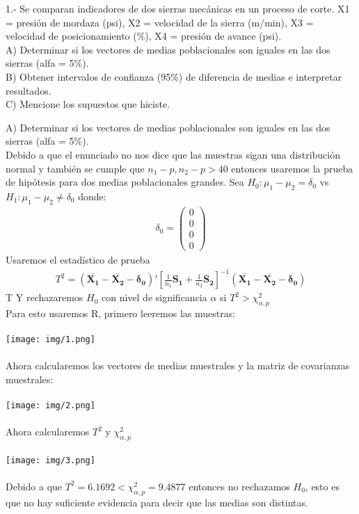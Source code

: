 \begin{problem}{1}
 1.- Se comparan indicadores de dos sierras mecánicas en un proceso de corte. 
X1 = presión de mordaza (psi), X2 = velocidad de la sierra (m/min), 
X3 = velocidad de posicionamiento (\%), X4 = presión de avance (psi).\\
A) Determinar si los vectores de medias poblacionales son iguales en las dos sierras (alfa = 5\%). \\
B) Obtener intervalos de confianza (95\%) de diferencia de medias e interpretar resultados.\\
C) Mencione los supuestos que hiciste.
\end{problem}
\begin{sol}
A) Determinar si los vectores de medias poblacionales son iguales en las dos sierras (alfa = 5\%). \\
Debido a que el enunciado no nos dice que las muestras sigan una distribución normal y también se cumple que $n_1-p,n_2-p>40$ entonces usaremos la prueba de hipótesis para dos medias poblacionales grandes.
Sea $H_0:\mu_1-\mu_2 = \delta_0$ vs $H_1: \mu_1 - \mu_2
\neq \delta_0$ donde:
\begin{align*}
\delta_0 = \begin{pmatrix}
0\\0\\0\\0
\end{pmatrix}
\end{align*}
Usaremos el estadístico de prueba
\begin{align*}
T^2 = (\bm{\bar{X_1}-\bar{X_2}-\delta_0})' \left[ \frac{1}{n_1}\bm{S_1}+\frac{1}{n_2}\bm{S_2} \right] ^{-1} (\bm{\bar{X_1}-\bar{X_2}-\delta_0})
\end{align*}T
Y rechazaremos $H_0$ con nivel de significancia $\alpha$ si $T^2 > \chi_{\alpha, p}^2$\\
Para esto usaremos R, primero leeremos las muestras:\\\\
\texttt{[image: img/1.png]}\\\\
Ahora calcularemos los vectores de medias muestrales y la matriz de covarianzas muestrales:\\\\
\texttt{[image: img/2.png]}\\\\
Ahora calcularemos $T^2$ y $\chi_{\alpha, p}^2$ \\\\
\texttt{[image: img/3.png]}\\\\
Debido a que $T^2=6.1692 < \chi_{\alpha, p}^2=9.4877$ entonces no rechazamos $H_0$, esto es que no hay suficiente evidencia para decir que las medias son distintas. 


\end{sol}
